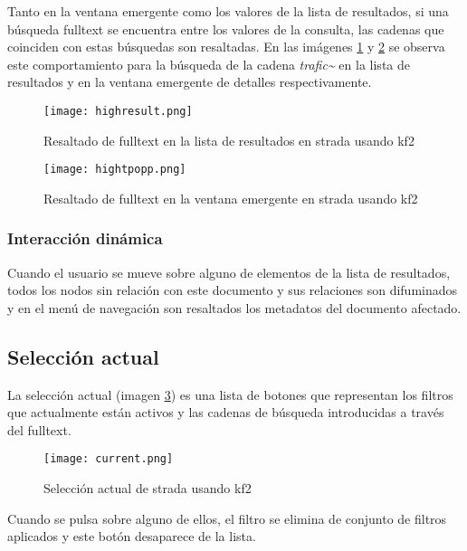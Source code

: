 Tanto en la ventana emergente como los valores de la lista de resultados, si una búsqueda \gls{fulltext} se encuentra entre los valores de la consulta, las cadenas que coinciden con estas búsquedas son resaltadas. En las imágenes \ref{image:hightlist} y \ref{image:hightpop} se observa este comportamiento para la búsqueda de la cadena \textit{trafic\~{}} en la lista de resultados y en la ventana emergente de detalles respectivamente.

\begin{figure}[h!]
  \centering
  	\texttt{[image: highresult.png]}
  \caption{Resaltado de \gls{fulltext} en la lista de resultados en \gls{strada} usando \gls{kf2}}
  \label{image:hightlist}
\end{figure}

\begin{figure}[h!]
  \centering
  	\texttt{[image: hightpopp.png]}
  \caption{Resaltado de \gls{fulltext} en la ventana emergente en \gls{strada} usando \gls{kf2}}
  \label{image:hightpop}
\end{figure}


\subsubsection*{Interacción dinámica}
Cuando el usuario se mueve sobre alguno de elementos de la lista de resultados, todos los nodos sin relación con este documento y sus relaciones son difuminados y en el menú de navegación son resaltados los \glspl{metadato} del documento afectado.

\subsection{Selección actual}
La selección actual (imagen \ref{image:manualselect}) es una lista de botones que representan los filtros que actualmente están activos y las cadenas de búsqueda introducidas a través del \gls{fulltext}.

\begin{figure}[h!]
  \centering
  	\texttt{[image: current.png]}
  \caption{Selección actual de \gls{strada} usando \gls{kf2}}
  \label{image:manualselect}
\end{figure}

Cuando se pulsa sobre alguno de ellos, el filtro se elimina de conjunto de filtros aplicados y este botón desaparece de la lista.


